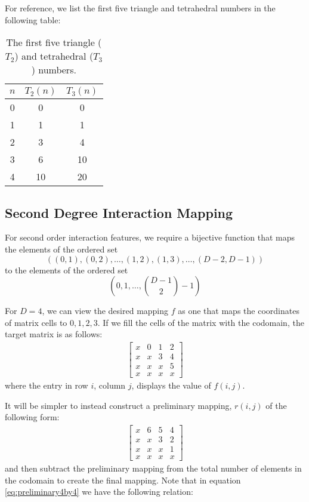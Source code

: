 \documentclass[journal]{journal}
\begin{document}
For reference, we list the first five triangle and tetrahedral numbers in the following table:
\begin{table}
  \centering
  \caption{The first five triangle ($T_2$) and tetrahedral ($T_3$) numbers.}
  \begin{tabular}{| c | c | c |}
    \hline
    $n$ & $T_2(n)$ & $T_3(n)$ \\
    \hline
    0 & 0 & 0 \\
    1 & 1 & 1 \\
    2 & 3 & 4 \\
    3 & 6 & 10 \\
    4 & 10 & 20 \\
    \hline  
  \end{tabular}
\end{table}

\subsection{Second Degree Interaction Mapping}
For second order interaction features, we require a bijective function that maps the elements of the ordered set
\begin{equation}
((0, 1), (0, 2), \dots, (1, 2), (1, 3), \dots, (D-2, D-1))
\end{equation}
to the elements of the ordered set
\begin{equation}
(0,1,\dots,\binom{D-1}{2}-1)
\end{equation}

For $D=4$, we can view the desired mapping $f$ as one that maps the coordinates of matrix cells to $0, 1, 2, 3$.
If we fill the cells of the matrix with the codomain, the target matrix is as follows:
\begin{align}
\begin{bmatrix}
x & 0 & 1 & 2 \\
x & x & 3 & 4 \\
x & x & x & 5 \\
x & x & x & x
\end{bmatrix}
\label{eq:4by4mat_inter}
\end{align}
where the entry in row $i$, column $j$, displays the value of $f(i, j)$.

It will be simpler to instead construct a preliminary mapping, $r(i, j)$ of the following form:
\begin{align}
\begin{bmatrix}
x & 6 & 5 & 4 \\
x & x & 3 & 2 \\
x & x & x & 1 \\
x & x & x & x
\end{bmatrix}
\label{eq:preliminary4by4}
\end{align}
and then subtract the preliminary mapping from the total number of elements in the codomain to create the final mapping.
Note that in equation \ref{eq:preliminary4by4} we have the following relation:
\end{document}
